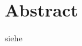 \section{Abstract}


\blindtext
siehe \cite{mySecondBook} 
\blindtext \cite{myBook}

 



\blindtext
